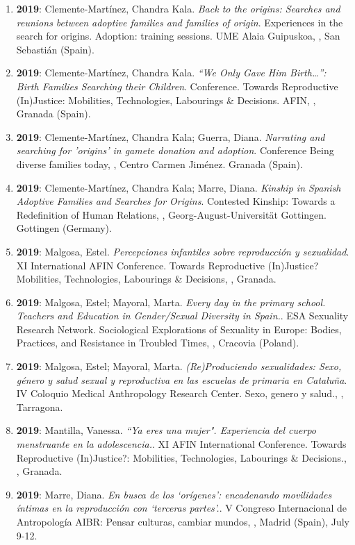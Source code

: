 \begin{enumerate}
\item {\bf 2019}: Clemente-Martínez, Chandra Kala. {\it Back to the origins: Searches and reunions between adoptive families and families of origin}. Experiences in the search for origins. Adoption: training sessions. UME Alaia Guipuskoa, , San Sebastián (Spain).\filbreak
\item {\bf 2019}: Clemente-Martínez, Chandra Kala. {\it “We Only Gave Him Birth…”: Birth Families Searching their Children}. Conference. Towards Reproductive (In)Justice: Mobilities, Technologies, Labourings \& Decisions. AFIN, , Granada (Spain).\filbreak
\item {\bf 2019}: Clemente-Martínez, Chandra Kala; Guerra, Diana. {\it Narrating and searching for 'origins' in gamete donation and adoption}. Conference Being diverse families today, , Centro Carmen Jiménez. Granada (Spain).\filbreak
\item {\bf 2019}: Clemente-Martínez, Chandra Kala; Marre, Diana. {\it Kinship in Spanish Adoptive Families and Searches for Origins}. Contested Kinship: Towards a Redefinition of Human Relations, , Georg-August-Universität Gottingen. Gottingen (Germany).\filbreak
\item {\bf 2019}: Malgosa, Estel. {\it Percepciones infantiles sobre reproducción y sexualidad}. XI International AFIN Conference. Towards Reproductive (In)Justice? Mobilities, Technologies, Labourings \& Decisions, , Granada.\filbreak
\item {\bf 2019}: Malgosa, Estel; Mayoral, Marta. {\it Every day in the primary school. Teachers and Education in Gender/Sexual Diversity in Spain.}. ESA Sexuality Research Network. Sociological Explorations of Sexuality in Europe: Bodies, Practices, and Resistance in Troubled Times, , Cracovia (Poland).\filbreak
\item {\bf 2019}: Malgosa, Estel; Mayoral, Marta. {\it (Re)Produciendo sexualidades: Sexo, género y salud sexual y reproductiva en las escuelas de primaria en Cataluña}. IV Coloquio Medical Anthropology Research Center. Sexo, genero y salud., , Tarragona.\filbreak
\item {\bf 2019}: Mantilla, Vanessa. {\it “Ya eres una mujer". Experiencia del cuerpo menstruante en la adolescencia.}. XI AFIN International Conference. Towards Reproductive (In)Justice?: Mobilities, Technologies, Labourings \& Decisions., , Granada.\filbreak
\item {\bf 2019}: Marre, Diana. {\it En busca de los ‘orígenes’: encadenando movilidades íntimas en la reproducción con ‘terceras partes’.}. V Congreso Internacional de Antropología AIBR: Pensar culturas, cambiar mundos, , Madrid (Spain), July 9-12.\filbreak

\end{enumerate}
